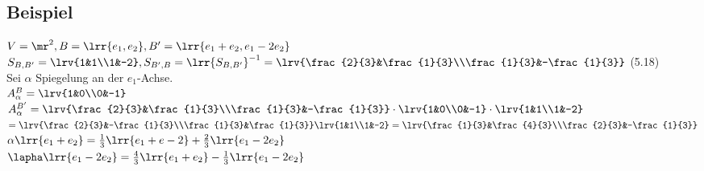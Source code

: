 \subsection{Beispiel}
	$V=\mr^2, B=\lrr{e_1,e_2}, B'=\lrr{e_1+e_2,e_1-2e_2}$\\
	$S_{B,B'}=\lrv{1&1\\1&-2}, S_{B',B}=\lrr{S_{B,B'}}^{-1}=\lrv{\frac{2}{3}&\frac{1}{3}\\\frac{1}{3}&-\frac{1}{3}}$ (5.18)\\
	Sei $\alpha$ Spiegelung an der $e_1$-Achse.\\
	$A_\alpha^B=\lrv{1&0\\0&-1}$\\
	$A_\alpha^{B'}=\lrv{\frac{2}{3}&\frac{1}{3}\\\frac{1}{3}&-\frac{1}{3}}\cdot\lrv{1&0\\0&-1}\cdot\lrv{1&1\\1&-2}$\\
	$=\lrv{\frac{2}{3}&-\frac{1}{3}\\\frac{1}{3}&\frac{1}{3}}\lrv{1&1\\1&-2}=\lrv{\frac{1}{3}&\frac{4}{3}\\\frac{2}{3}&-\frac{1}{3}}$\\
	$\alpha\lrr{e_1+e_2}=\frac{1}{3}\lrr{e_1+e-2}+\frac{2}{3}\lrr{e_1-2e_2}$\\
	$\lapha\lrr{e_1-2e_2}=\frac{4}{3}\lrr{e_1+e_2}-\frac{1}{3}\lrr{e_1-2e_2}$